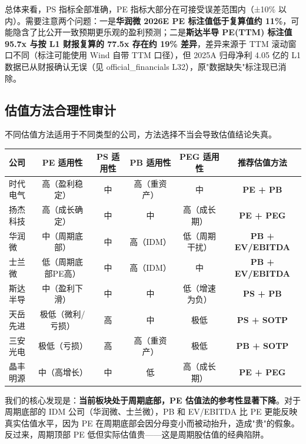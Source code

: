 总体来看，PS 指标全部准确，PE 指标大部分在可接受误差范围内（±10\% 以内）。需要注意两个问题：一是\textbf{华润微 2026E PE 标注值低于复算值约 11\%}，可能隐含了比公开一致预期更乐观的盈利预测；二是\textbf{斯达半导 PE(TTM) 标注值 95.7x 与按 L1 财报复算的 77.5x 存在约 19\% 差异}，差异来源于 TTM 滚动窗口不同（标注可能使用 Wind 自带 TTM 口径），但 2025A 归母净利 4.05 亿的 L1 数据已从财报确认无误（见 official\_financials L32），原"数据缺失"标注现已消除。

\subsection{估值方法合理性审计}

不同估值方法适用于不同类型的公司，方法选择不当会导致估值结论失真。

\begin{exhibitbox}[表 7-10：各公司估值方法适用性评估]
\centering
\small
\begin{tabularx}{\textwidth}{X c c c c c}
\toprule
\textbf{公司} & \textbf{PE 适用性} & \textbf{PS 适用性} & \textbf{PB 适用性} & \textbf{PEG 适用性} & \textbf{推荐估值方法} \\
\midrule
\rowcolor{riskgreen!10}
时代电气 & 高（盈利稳定） & 中 & 高（重资产） & 中 & \textbf{PE + PB} \\
\rowcolor{riskgreen!10}
扬杰科技 & 高（成长确定） & 中 & 中 & 高（成长期） & \textbf{PE + PEG} \\
\rowcolor{riskamber!10}
华润微 & 中（周期底部） & 中 & 高（IDM） & 低（周期干扰） & \textbf{PB + EV/EBITDA} \\
\rowcolor{riskamber!10}
士兰微 & 低（周期底部PE高） & 中 & 高（IDM） & 中 & \textbf{PB + EV/EBITDA} \\
\rowcolor{riskamber!10}
斯达半导 & 中（盈利下滑） & 中 & 中 & 低（增速为负） & \textbf{PS + PB} \\
\rowcolor{riskred!10}
天岳先进 & 极低（微利/亏损） & 高 & 中 & 极低 & \textbf{PS + SOTP} \\
\rowcolor{riskred!10}
三安光电 & 极低（亏损） & 高 & 高（重资产） & 极低 & \textbf{PB + SOTP} \\
\rowcolor{riskamber!10}
晶丰明源 & 中（高增长） & 中 & 低 & 高（成长期） & \textbf{PE + PEG} \\
\bottomrule
\end{tabularx}
\end{exhibitbox}

我们的核心发现是：\textbf{当前板块处于周期底部，PE 估值法的参考性显著下降}。对于周期底部的 IDM 公司（华润微、士兰微），PB 和 EV/EBITDA 比 PE 更能反映真实估值水平，因为 PE 在周期底部会因分母变小而被动抬升，造成"贵"的假象。反过来，周期顶部 PE 低但实际估值贵——这是周期股估值的经典陷阱。

